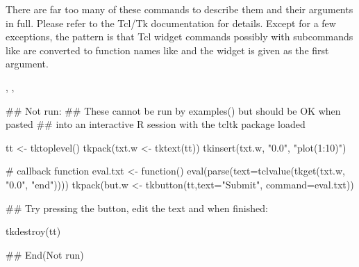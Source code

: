 %
\begin{Details}\relax
There are far too many of these commands to describe them and their
arguments in full. Please refer to the Tcl/Tk documentation for details.
Except for a few exceptions, the pattern is that  Tcl widget commands
possibly with subcommands like
 are converted to function names like
 and the widget is given as the first argument. 
\end{Details}
%
\begin{SeeAlso}\relax
{}, ,
\end{SeeAlso}
%
\begin{Examples}
\begin{ExampleCode}
## Not run: 
## These cannot be run by examples() but should be OK when pasted
## into an interactive R session with the tcltk package loaded

tt <- tktoplevel()
tkpack(txt.w <- tktext(tt))
tkinsert(txt.w, "0.0", "plot(1:10)")

# callback function 
eval.txt <- function()
   eval(parse(text=tclvalue(tkget(txt.w, "0.0", "end"))))
tkpack(but.w <- tkbutton(tt,text="Submit", command=eval.txt))

## Try pressing the button, edit the text and when finished:

tkdestroy(tt)

## End(Not run)

\end{ExampleCode}
\end{Examples}
